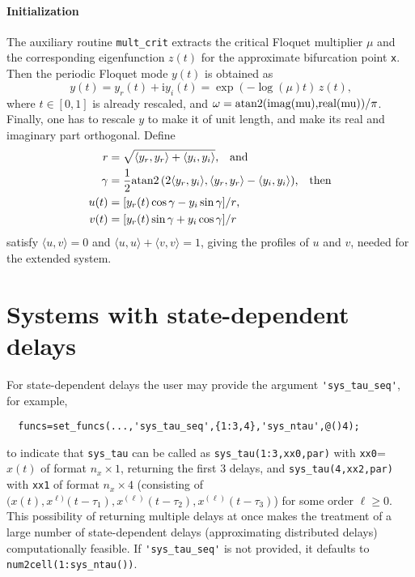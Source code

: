 \documentclass[11pt]{scrartcl}
\newcommand{\mt}[1]{\mathrm{#1}}
\renewcommand{\i}{\mt{i}}
\newcommand{\blist}[1]{\mbox{\lstinline!#1!}}
\begin{document}
\paragraph{Initialization}
The auxiliary routine \blist{mult_crit} extracts the critical Floquet
multiplier $\mu$ and the corresponding eigenfunction $z(t)$ for the
approximate bifurcation point \blist{x}. Then the periodic Floquet
mode $y(t)$ is obtained as
\begin{displaymath}
y(t)=y_r(t)+\i y_i(t)=\exp(-\log(\mu)t)\,z(t)\mbox{,}
\end{displaymath}
where $t\in[0,1]$ is already rescaled, and
$\omega=\blist{atan2(imag(mu),real(mu))}/\pi$. Finally, one has to
rescale $y$ to make it of unit length, and make its real and imaginary
part orthogonal. Define
\begin{align*}
  r&=\sqrt{\langle y_r,y_r\rangle+\langle
    y_i,y_i\rangle}\mbox{,\quad and }\\
  \gamma&=\frac{1}{2}\blist{atan2}\,(2\langle
  y_r,y_i\rangle,\langle
  y_r,y_r\rangle-\langle y_i,y_i\rangle)\mbox{,\quad then}\\
  u(t)&=[y_r(t)\cos\gamma-y_i\sin\gamma]/r\mbox{,}\\
  v(t)&=[y_r(t)\sin\gamma+y_i\cos\gamma]/r
\end{align*}
satisfy $\langle u,v\rangle=0$ and $\langle u,u\rangle+\langle
v,v\rangle=1$, giving the profiles of $u$ and $v$, needed for the
extended system.

\section{Systems with state-dependent delays}
\label{sec:sd-dde}
For state-dependent delays the user may provide the argument \blist{'sys_tau_seq'}, for example,
\begin{lstlisting}
  funcs=set_funcs(...,'sys_tau_seq',{1:3,4},'sys_ntau',@()4);
\end{lstlisting}
to indicate that \blist{sys_tau} can be called as
\blist{sys_tau(1:3,xx0,par)} with \blist{xx0}=$x(t)$ of format
$n_x\times1$, returning the first $3$ delays, and
\blist{sys_tau(4,xx2,par)} with \blist{xx1} of format $n_x\times4$
(consisting of
$(x(t),x^{\ell)}(t-\tau_1),x^{(\ell)}(t-\tau_2),x^{(\ell)}(t-\tau_3)$)
for some order $\ell\geq0$.  This possibility of returning multiple
delays at once makes the treatment of a large number of
state-dependent delays (approximating distributed delays)
computationally feasible. If \blist{'sys_tau_seq'} is not provided, it
defaults to \blist{num2cell(1:sys_ntau())}.
\end{document}
